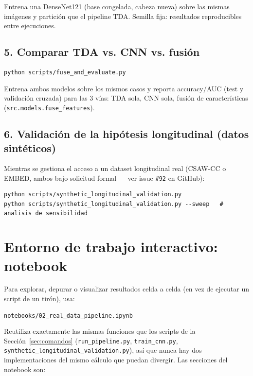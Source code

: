 \documentclass[11pt,a4paper]{article}
\begin{document}
Entrena una DenseNet121 (base congelada, cabeza nueva) sobre las mismas
imágenes y partición que el pipeline TDA. Semilla fija: resultados
reproducibles entre ejecuciones.

\subsection{5. Comparar TDA vs. CNN vs. fusión}

\begin{lstlisting}
python scripts/fuse_and_evaluate.py
\end{lstlisting}

Entrena ambos modelos sobre los mismos casos y reporta accuracy/AUC (test y
validación cruzada) para las 3 vías: TDA sola, CNN sola, fusión de
características (\texttt{src.models.fuse\_features}).

\subsection{6. Validación de la hipótesis longitudinal (datos sintéticos)}

Mientras se gestiona el acceso a un dataset longitudinal real (CSAW-CC o
EMBED, ambos bajo solicitud formal — ver issue \texttt{\#92} en GitHub):

\begin{lstlisting}
python scripts/synthetic_longitudinal_validation.py
python scripts/synthetic_longitudinal_validation.py --sweep   # analisis de sensibilidad
\end{lstlisting}

\section{Entorno de trabajo interactivo: notebook}
\label{sec:notebook}

Para explorar, depurar o visualizar resultados celda a celda (en vez de
ejecutar un script de un tirón), usa:

\begin{center}
\texttt{notebooks/02\_real\_data\_pipeline.ipynb}
\end{center}

Reutiliza exactamente las mismas funciones que los scripts de la
Sección~\ref{sec:comandos} (\texttt{run\_pipeline.py},
\texttt{train\_cnn.py}, \texttt{synthetic\_longitudinal\_validation.py}), así
que nunca hay dos implementaciones del mismo cálculo que puedan divergir.
Las secciones del notebook son:
\end{document}
